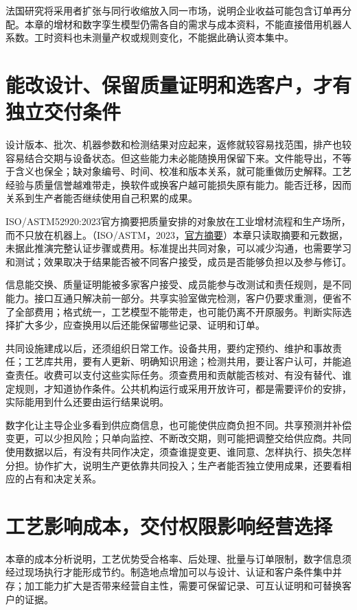 \documentclass[UTF8,fontset=windows,12pt,a4paper,oneside,openany]{ctexbook}
\begin{document}
法国研究将采用者扩张与同行收缩放入同一市场，说明企业收益可能包含订单再分配。本章的增材和数字孪生模型仍需各自的需求与成本资料，不能直接借用机器人系数。工时资料也未测量产权或规则变化，不能据此确认资本集中。



\section{能改设计、保留质量证明和选客户，才有独立交付条件}

设计版本、批次、机器参数和检测结果对应起来，返修就较容易找范围，排产也较容易结合交期与设备状态。但这些能力未必能随换用保留下来。文件能导出，不等于含义也保全；缺对象编号、时间、校准和版本关系，就可能重做历史解释。工艺经验与质量信誉越难带走，换软件或换客户越可能损失原有能力。能否迁移，因而关系到生产者能否继续使用自己积累的成果。

ISO/ASTM52920:2023官方摘要把质量安排的对象放在工业增材流程和生产场所，而不只放在机器上。（ISO/ASTM，2023，\href{https://www.iso.org/standard/76911.html?browse=tc}{官方摘要}）本章只读取摘要和元数据，未据此推演完整认证步骤或费用。标准提出共同对象，可以减少沟通，也需要学习和测试；效果取决于结果能否被不同客户接受，成员是否能够负担以及参与修订。

信息能交换、质量证明能被多家客户接受、成员能参与改测试和责任规则，是不同能力。接口互通只解决前一部分。共享实验室做完检测，客户仍要求重测，便省不了全部费用；格式统一，工艺模型不能带走，也可能仍离不开原服务。判断实际选择扩大多少，应查换用以后还能保留哪些记录、证明和订单。

共同设施建成以后，还须组织日常工作。设备共用，要约定预约、维护和事故责任；工艺库共用，要有人更新、明确知识用途；检测共用，要让客户认可，并能追查责任。收费可以支付这些实际任务。须查费用和贡献能否核对、有没有替代、谁定规则，才知道协作条件。公共机构运行或采用开放许可，都是需要评价的安排，实际能用到什么还要由运行结果说明。

数字化让主导企业多看到供应商信息，也可能使供应商负担不同。共享预测并补偿变更，可以少担风险；只单向监控、不断改交期，则可能把调整交给供应商。共同使用数据以后，有没有共同作决定，须查谁提变更、谁同意、怎样执行、损失怎样分担。协作扩大，说明生产更依靠共同投入；生产者能否独立使用成果，还要看相应的占有和决定关系。

\section{工艺影响成本，交付权限影响经营选择}

本章的成本分析说明，工艺优势受合格率、后处理、批量与订单限制，数字信息须经过现场执行才能形成节约。制造地点增加可以与设计、认证和客户条件集中并存；加工能力扩大是否带来经营自主性，需要可保留记录、可互认证明和可替换客户的证据。
\end{document}
